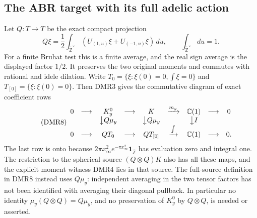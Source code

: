 \subsection{The ABR target with its full adelic action}

Let $Q:T\to T$ be the exact compact projection
\begin{equation}\tag{DMR7}
Q\xi=\frac12\int_{\widehat{\mathbb Z}^{\times}}
              (U_{(1,u)}\xi+U_{(-1,u)}\xi)\,du,
\qquad \int_{\widehat{\mathbb Z}^{\times}}du=1.
\end{equation}
For a finite Bruhat test this is a finite average, and the real
sign average is the displayed factor $1/2$. It preserves the two
original moments and commutes with rational and idele dilation.
Write $T_0=\{\xi:\xi(0)=0,\int\xi=0\}$ and
$T_{[0]}=\{\xi:\xi(0)=0\}$. Then DMR3 gives the commutative
diagram of exact coefficient rows
\begin{equation}\tag{DMR8}
\begin{array}{ccccccccc}
0&\longrightarrow&K_y^0&\longrightarrow&K
 &\xrightarrow{m_y}&\mathbb C(1)&\longrightarrow&0\\
&&\big\downarrow Q\mu_y&&\big\downarrow Q\mu_y
 &&\big\downarrow I\\
0&\longrightarrow&QT_0&\longrightarrow&QT_{[0]}
 &\xrightarrow{\int}&\mathbb C(1)&\longrightarrow&0.
\end{array}
\end{equation}
The last row is onto because
$2\pi x_\infty^2e^{-\pi x_\infty^2}\mathbf1_{\widehat{\mathbb Z}}$
has evaluation zero and integral one.
The restriction to the spherical source $(Q\otimes Q)K$ also
has all these maps, and the explicit moment witness DMR4 lies
in that source. The full-source definition in DMR8 instead
uses $Q\mu_y$: independent averaging in the two tensor factors
has not been identified with averaging their diagonal pullback.
In particular no identity $\mu_y(Q\otimes Q)=Q\mu_y$, and no
preservation of $K_y^0$ by $Q\otimes Q$, is needed or asserted.

